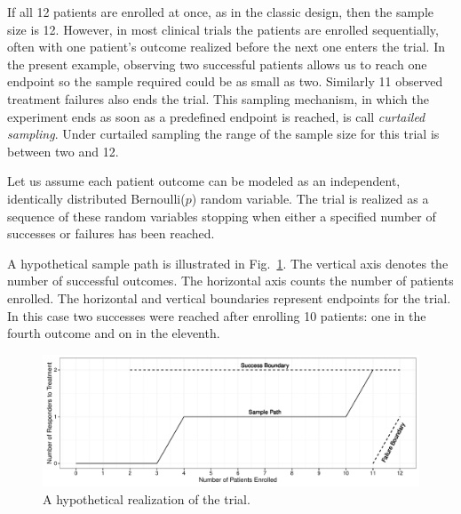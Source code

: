 \documentclass[review]{elsarticle}
\begin{document}
If all 12 patients are enrolled at once, as in the classic
design, then the sample size is 12. However, in most clinical trials the
patients are enrolled sequentially, often with one patient's outcome realized
before the next one enters the trial. In the present example, observing two
successful patients allows us to reach one endpoint so the sample required
could be as small as two. Similarly 11
observed treatment failures also ends the trial. This sampling mechanism, in
which the experiment ends as soon as a predefined endpoint is reached, is
call {\em curtailed sampling}. Under curtailed sampling the range of the
sample size for this trial is between two and 12.

Let us assume each patient outcome can be modeled as an independent,
identically distributed Bernoulli($p$) random variable. The trial is realized
as a sequence of these random variables stopping when either a
specified number of successes or failures has been reached. 

A hypothetical sample path is illustrated in Fig.~\ref{fig:kane_viz}.
The vertical axis denotes the number of
successful outcomes. The horizontal axis counts the number of patients 
enrolled. The horizontal and vertical boundaries represent
endpoints for the trial. In this case two successes were reached after
enrolling 10 patients: one in the fourth outcome and on in the eleventh.

\begin{figure}[t!]
\includegraphics[width=\textwidth]{KanePlot.pdf}
\caption{
A hypothetical realization of the trial.
}
\label{fig:kane_viz}
\end{figure}
\end{document}

